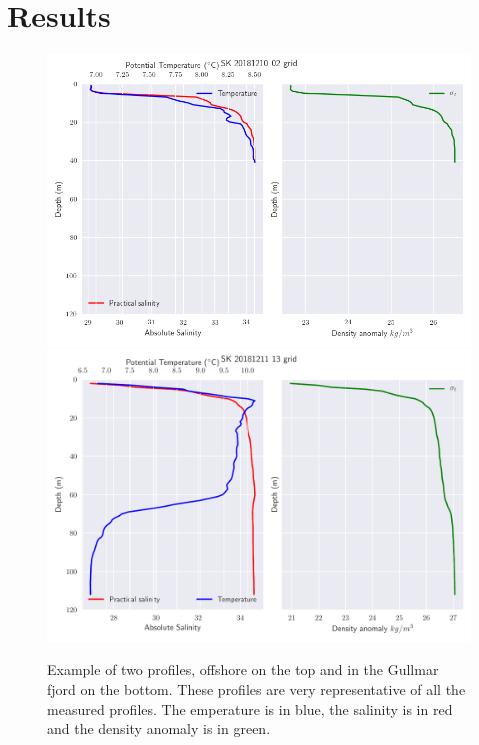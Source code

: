 \documentclass[12pt,a4paper]{article}
\begin{document}
\section{Results}

\begin{figure}
  \centering
  \includegraphics[width=\textwidth]{prof_offshore}
  \includegraphics[width=\textwidth]{prof_fjord}
  \caption{\label{fig:profex}Example of two profiles, offshore on the top and in
    the Gullmar fjord on the bottom.
    These profiles are very representative of all the measured profiles.
    The emperature is in blue, the salinity is in red and the density anomaly
  is in green.}
\end{figure}
\end{document}
